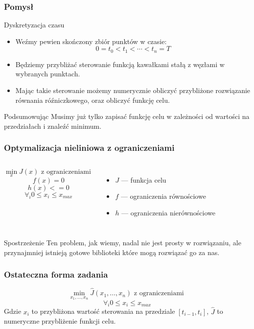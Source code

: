 \documentclass{beamer}
\newcommand{\colw}[1]{\column{#1\textwidth}}
\begin{document}
\begin{frame}
  \frametitle{Pomysł}
  \begin{center}{\large Dyskretyzacja czasu}\end{center}
  \begin{itemize}
  \item Weźmy pewien skończony zbiór punktów w czasie:
    \[0 = t_0 < t_1 < \cdots < t_n = T\]
  \item Będziemy przybliżać sterowanie funkcją kawałkami stałą z węzłami w wybranych punktach.
  \item Mając takie sterowanie możemy numerycznie obliczyć przybliżone rozwiązanie równania róźniczkowego, oraz obliczyć funkcję celu.
  \end{itemize}
  \begin{block}{Podsumowując}
    Musimy już tylko zapisać funkcję celu w zależności od wartości na przedziałach i znaleźć minimum.
  \end{block}
\end{frame}

\begin{frame}
  \frametitle{Optymalizacja nieliniowa z ograniczeniami}
  \begin{columns}
    \colw{.5}
    \[\min_x J(x) \text{ z ograniczeniami }\]
    \[f(x) = 0\]
    \[h(x) <= 0\]
    \[\forall_i 0 \le x_i \le x_{max}\]
    \colw{.5}
    \begin{itemize}
    \item $J$ --- funkcja celu
    \item $f$ --- ograniczenia równościowe
    \item $h$ --- ograniczenia nierównościowe
    \end{itemize}
  \end{columns}
  \begin{block}{Spostrzeżenie}
    Ten problem, jak wiemy, nadal nie jest prosty w rozwiązaniu, ale przynajmniej istnieją gotowe biblioteki które mogą rozwiązać go za nas.
  \end{block}
\end{frame}

\begin{frame}
    \frametitle{Ostateczna forma zadania}
    \[\min_{x_1,\ldots,x_n} \hat{J}(x_1,\ldots, x_n) \text{ z ograniczeniami } \]
    \[\forall_i 0 \le x_i \le x_{max}\]
    Gdzie $x_i$ to przybliżona wartość sterowania na przedziale $[t_{i-1}, t_i]$, $\hat{J}$ to numeryczne przybliżenie funkcji celu.
\end{frame}
\end{document}
